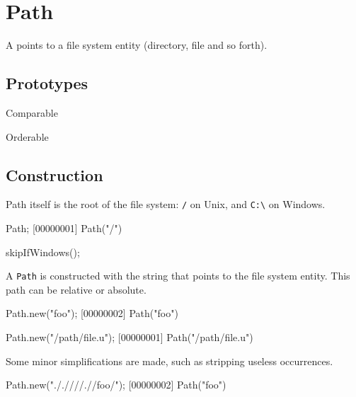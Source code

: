 
\section{Path}

A  points to a file system entity (directory, file and so
forth).

\subsection{Prototypes}
\begin{refObjects}
\item[Comparable]
\item[Orderable]
\end{refObjects}

\subsection{Construction}

Path itself is the root of the file system: \lstinline|/| on Unix, and
\lstinline|C:\| on Windows.

\begin{urbiscript}[firstnumber=1]
Path;
[00000001] Path("/")
\end{urbiscript}
\begin{urbicomment}
skipIfWindows();
\end{urbicomment}

A \lstinline|Path| is constructed with the string that points to the file
system entity.  This path can be relative or absolute.

\begin{urbiscript}[firstnumber=1]
Path.new("foo");
[00000002] Path("foo")

Path.new("/path/file.u");
[00000001] Path("/path/file.u")
\end{urbiscript}

Some minor simplifications are made, such as stripping useless
 occurrences.

\begin{urbiscript}
Path.new("././///.//foo/");
[00000002] Path("foo")
\end{urbiscript}


